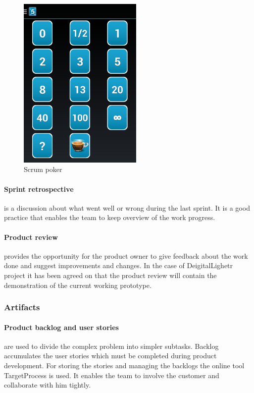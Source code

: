 \begin{figure}[H]
    \centering
        \includegraphics[width=6cm]{planning/scrumPoker.png}
    \caption{Scrum poker}
    \label{fig:scrumPoker }
\end{figure}

\paragraph{Sprint retrospective} is a discussion about what went well or wrong during the last sprint. It is a good practice that enables the team to keep overview of the work progress.

\paragraph{Product review} provides the opportunity for the product owner to give feedback about the work done and suggest improvements and changes. In the case of DeigitalLighetr project it has been agreed on that the product review will contain the demonstration of the current working prototype.

\subsubsection{Artifacts}

\paragraph{Product backlog and user stories} are used to divide the complex problem into simpler subtasks. Backlog accumulates the user stories which must be completed during product development. For storing the stories and managing the backlogs the online tool TargetProcess is used. It enables the team to involve the customer and collaborate with him tightly.

